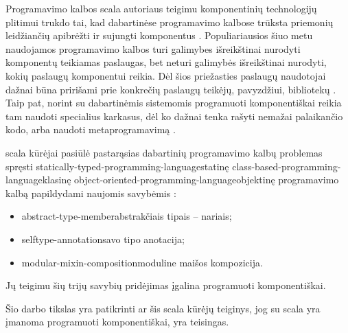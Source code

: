Programavimo kalbos \gls{scala}{} autoriaus  teigimu komponentinių technologijų plitimui trukdo
tai, kad dabartinėse programavimo kalbose trūksta priemonių leidžiančių
apibrėžti ir sujungti komponentus \cite{odersky:scala-experiment}.
Populiariausios šiuo metu naudojamos programavimo kalbos turi galimybes
išreikštinai nurodyti komponentų teikiamas paslaugas, bet neturi
galimybės išreikštinai nurodyti, kokių paslaugų
komponentui reikia. Dėl šios priežasties paslaugų naudotojai dažnai
būna pririšami prie konkrečių paslaugų teikėjų, pavyzdžiui,
bibliotekų \cite{scalable-component-abstractions}. Taip pat, norint
su dabartinėmis sistemomis programuoti komponentiškai reikia
tam naudoti specialius karkasus, dėl ko dažnai tenka rašyti
nemažai palaikančio  kodo, arba naudoti
metaprogramavimą \cite{extensible-software-components}.

\gls{scala}{} kūrėjai pasiūlė pastarąsias
dabartinių programavimo kalbų problemas spręsti
\gls{statically-typed-programming-language}{statinę}
\gls{class-based-programming-language}{klasinę}
\gls{object-oriented-programming-language}{objektinę} programavimo
kalbą papildydami naujomis savybėmis
\cite{scalable-component-abstractions}:
\begin{itemize}
  \item \gls{abstract-type-member}{abstrakčiais tipais – nariais};
  \item \gls{selftype-annotation}{savo tipo anotacija};
  \item \gls{modular-mixin-composition}{moduline maišos kompozicija}.
\end{itemize}
Jų teigimu \cite[1]{scalable-component-abstractions} šių trijų savybių
pridėjimas įgalina programuoti komponentiškai.

Šio darbo tikslas yra patikrinti ar šis \gls{scala}{}
kūrėjų teiginys, jog su \gls{scala}{} yra įmanoma
programuoti komponentiškai, yra teisingas.

